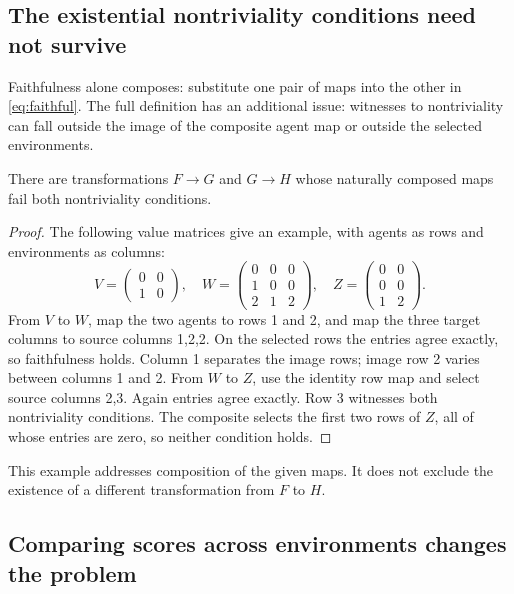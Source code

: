\documentclass[11pt]{article}
\begin{document}
\subsection{The existential nontriviality conditions need not survive}

Faithfulness alone composes: substitute one pair of maps into the
other in \eqref{eq:faithful}. The full definition has an additional
issue: witnesses to nontriviality can fall outside the image of the
composite agent map or outside the selected environments.

\begin{proposition}\label{prop:noncomposition}
There are transformations $F\to G$ and $G\to H$ whose naturally
composed maps fail both nontriviality conditions.
\end{proposition}
\begin{proof}
The following value matrices give an example,
with agents as rows and environments as columns:
\[
 V=\begin{pmatrix}0&0\\1&0\end{pmatrix},\quad
 W=\begin{pmatrix}0&0&0\\1&0&0\\2&1&2\end{pmatrix},\quad
 Z=\begin{pmatrix}0&0\\0&0\\1&2\end{pmatrix}.
\]
From $V$ to $W$, map the two agents to rows 1 and 2, and map the
three target columns to source columns 1,2,2. On the selected rows
the entries agree exactly, so faithfulness holds. Column 1 separates
the image rows; image row 2 varies between columns 1 and 2.
From $W$ to $Z$, use the identity row map and select source columns
2,3. Again entries agree exactly. Row 3 witnesses both nontriviality
conditions. The composite selects the first two rows of $Z$, all
of whose entries are zero, so neither condition holds.

\end{proof}

This example addresses composition of the given maps. It does not
exclude the existence of a different transformation from $F$ to $H$.

\subsection{Comparing scores across environments changes the problem}
\end{document}
